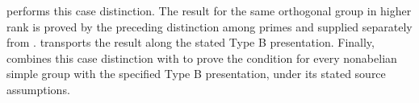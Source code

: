 \begin{implementation}
 performs this
case distinction. The  result for the same orthogonal
group in higher rank is proved by the preceding distinction among primes
and supplied separately from .
 transports the result along the
stated Type B presentation. Finally,
 combines this
case distinction with  to prove the condition
for every nonabelian simple group with the specified Type B
presentation, under its stated source assumptions.
\end{implementation}
